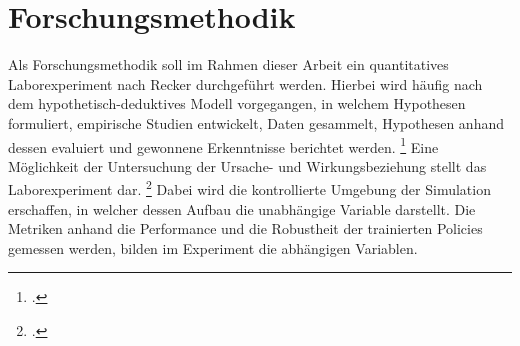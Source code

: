 \section{Forschungsmethodik}

Als Forschungsmethodik soll im Rahmen dieser Arbeit ein quantitatives Laborexperiment nach Recker \cite*[]{Recker.2021} durchgeführt werden.
Hierbei wird häufig nach dem hypothetisch-deduktives Modell vorgegangen, in welchem Hypothesen formuliert, empirische Studien entwickelt, Daten gesammelt, Hypothesen anhand dessen evaluiert und gewonnene Erkenntnisse berichtet werden. \footcite[Vgl.][S. S.89f.]{Recker.2021}
Eine Möglichkeit der Untersuchung der Ursache- und Wirkungsbeziehung stellt das Laborexperiment dar. \footcite[Vgl.][S. 106]{Recker.2021}
Dabei wird die kontrollierte Umgebung der Simulation erschaffen, in welcher dessen Aufbau die unabhängige Variable darstellt.
Die Metriken anhand die Performance und die Robustheit der trainierten Policies gemessen werden, bilden im Experiment die abhängigen Variablen.

